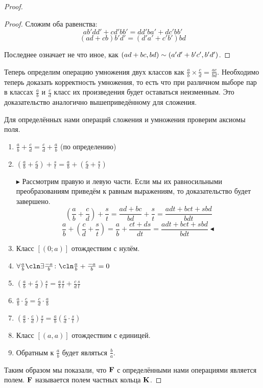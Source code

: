 \begin{proof}
\begin{proof}
  Сложим оба равенства:
  $$ ab'dd'+cd'bb'= dd'ba'+dc'bb'$$
  $$(ad+cb)b'd'   =(d'a'+c'b')bd $$

  Последнее означает не что иное, как $(ad+bc,bd)\bw\sim(a'd'+b'c',b'd')$.
\end{proof}

Теперь определим операцию умножения двух классов как $\frac{a}{b}\times\frac{c}{d}=\frac{ac}{bd}$. Необходимо теперь доказать корректность умножения, то есть что при различном выборе пар в классах $\frac{a}{b}$ и $\frac{c}{d}$ класс их произведения будет оставаться неизменным. Это доказательство аналогично вышеприведённому для сложения.

Для определённых нами операций сложения и умножения проверим аксиомы поля.

\begin{enumerate}
 \item $\frac{a}{b}+\frac{c}{d}=\frac{c}{d}+\frac{a}{b}$ (по определению)
 \item $\left(\frac{a}{b}+\frac{c}{d}\right)+\frac{s}{t} = \frac{a}{b}+\left(\frac{c}{d}+\frac{s}{t}\right)$

   $\blacktriangleright$ Рассмотрим правую и левую части. Если мы их равносильными преобразованиям приведём к равным выражениям, то доказательство будет завершено.
   $$\left(\frac{a}{b}+\frac{c}{d}\right)+\frac{s}{t}=\frac{ad+bc}{bd}+\frac{s}{t}=\frac{adt+bct+sbd}{bdt}$$
   $$\frac{a}{b}+\left(\frac{c}{d}+\frac{s}{t}\right)=\frac{a}{b}+\frac{ct+ds}{dt}=\frac{adt+bct+sbd}{bdt}\blacktriangleleft$$

 \item Класс $[(0;a)]$ отождествим с нулём.
 \item $\forall\frac{a}{b}\cln\exists\frac{-a}{b}\colon\cln\frac{a}{b}+\frac{-a}{b}=0$
 \item $\left( \frac{a}{b}+\frac{c}{d} \right)\frac{s}{t}= \frac{a}{b}\frac{s}{t}+\frac{c}{d}\frac{s}{t}$
 \item $\frac{a}{b}\cdot\frac{c}{d}=\frac{c}{d}\cdot\frac{a}{b}$
 \item $\left(\frac{a}{b}\cdot\frac{c}{d}\right)\frac{s}{t}=\frac{a}{b}\left(\frac{c}{d}\cdot\frac{s}{t}\right)$
 \item Класс $[(a,a)]$ отождествим с единицей.
 \item Обратным к $\frac{a}{b}$ будет являться $\frac{b}{a}$.
\end{enumerate}

Таким образом мы показали, что $\mathbf{F}$ с определёнными нами операциями
является полем. $\mathbf{F}$ называется полем частных кольца $\mathbf{K}$.


\end{proof}
